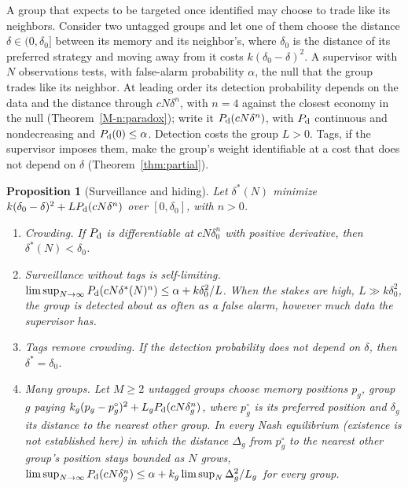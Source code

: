 \documentclass[12pt]{article}
\newtheorem{proposition}[theorem]{Proposition}
\theoremstyle{definition}
\theoremstyle{remark}
\begin{document}
A group that expects to be targeted once identified may choose to trade like its neighbors. Consider two untagged groups and let one of them choose the distance $\delta\in(0,\delta_0]$ between its memory and its neighbor's, where $\delta_0$ is the distance of its preferred strategy and moving away from it costs $k(\delta_0-\delta)^2$. A supervisor with $N$ observations tests, with false-alarm probability $\alpha$, the null that the group trades like its neighbor. At leading order its detection probability depends on the data and the distance through $cN\delta^n$, with $n=4$ against the closest economy in the null (Theorem~\ref{M-n:paradox}); write it $P_{\rm d}(cN\delta^n)$, with $P_{\rm d}$ continuous and nondecreasing and $P_{\rm d}(0)\le\alpha$. Detection costs the group $L>0$. Tags, if the supervisor imposes them, make the group's weight identifiable at a cost that does not depend on $\delta$ (Theorem~\ref{thm:partial}).

\begin{proposition}[Surveillance and hiding]\label{prop:hidegame}
Let $\delta^*(N)$ minimize $k(\delta_0-\delta)^2+LP_{\rm d}(cN\delta^n)$ over $[0,\delta_0]$, with $n>0$.
\begin{enumerate}[label=(\roman*),itemsep=1pt]
\item \emph{Crowding.} If $P_{\rm d}$ is differentiable at $cN\delta_0^n$ with positive derivative, then $\delta^*(N)<\delta_0$.
\item \emph{Surveillance without tags is self-limiting.} $\limsup_{N\to\infty}P_{\rm d}(cN\delta^*(N)^n)\le\alpha+k\delta_0^2/L$. When the stakes are high, $L\gg k\delta_0^2$, the group is detected about as often as a false alarm, however much data the supervisor has.
\item \emph{Tags remove crowding.} If the detection probability does not depend on $\delta$, then $\delta^*=\delta_0$.
\item \emph{Many groups.} Let $M\ge2$ untagged groups choose memory positions $p_g$, group $g$ paying $k_g(p_g-p^\circ_g)^2+L_gP_{\rm d}(cN\delta_g^n)$, where $p^\circ_g$ is its preferred position and $\delta_g$ its distance to the nearest other group. In every Nash equilibrium (existence is not established here) in which the distance $\Delta_g$ from $p^\circ_g$ to the nearest other group's position stays bounded as $N$ grows, $\limsup_{N\to\infty}P_{\rm d}(cN\delta_g^n)\le\alpha+k_g\limsup_N\Delta_g^2/L_g$ for every group.
\end{enumerate}
\end{proposition}
\end{document}
